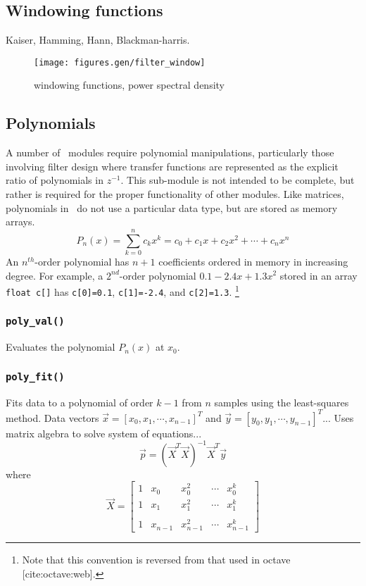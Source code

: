 \subsection{Windowing functions}
Kaiser, Hamming, Hann, Blackman-harris.

\begin{figure}
\centering
  \texttt{[image: figures.gen/filter\_window]}
\caption{windowing functions, power spectral density}
\label{fig:module:math:window}
\end{figure}

\subsection{Polynomials}
A number of \liquid\ modules require polynomial manipulations, particularly
those involving filter design where transfer functions are represented as the
explicit ratio of polynomials in $z^{-1}$.
This sub-module is not intended to be complete, but rather is required for
the proper functionality of other modules.
Like matrices, polynomials in \liquid\ do not use a particular data type, but
are stored as memory arrays.
\[
    P_n(x) = \sum_{k=0}^{n}{c_k x^k}
           = c_0 + c_1 x + c_2 x^2 + \cdots + c_n x^n
\]
An $n^{th}$-order polynomial has $n+1$ coefficients ordered in memory in
increasing degree.
For example, a $2^{nd}$-order polynomial $0.1 -2.4x + 1.3x^2$ stored in an
array {\tt float c[]} has
{\tt c[0]=0.1},
{\tt c[1]=-2.4}, and
{\tt c[2]=1.3}.%
\footnote{Note that this convention is reversed from that used in octave
[cite:octave:web].}

\subsubsection{{\tt poly\_val()}}
Evaluates the polynomial $P_n(x)$ at $x_0$.

\subsubsection{{\tt poly\_fit()}}
Fits data to a polynomial of order $k-1$ from $n$ samples using the
least-squares method.
Data vectors
$\vec{x}=[x_0,x_1,\cdots,x_{n-1}]^T$ and 
$\vec{y}=[y_0,y_1,\cdots,y_{n-1}]^T$...
Uses matrix algebra to solve system of equations...
\[
    \vec{p} = \left(\vec{X}^T\vec{X}\right)^{-1}\vec{X}^T\vec{y}
\]
where
\[
    \vec{X} = 
    \begin{bmatrix}
        1   & x_0       & x_0^2     & \cdots    & x_0^{k}     \\
        1   & x_1       & x_1^2     & \cdots    & x_1^{k}     \\
        \\
        1   & x_{n-1}   & x_{n-1}^2 & \cdots    & x_{n-1}^{k}
    \end{bmatrix}
\]


